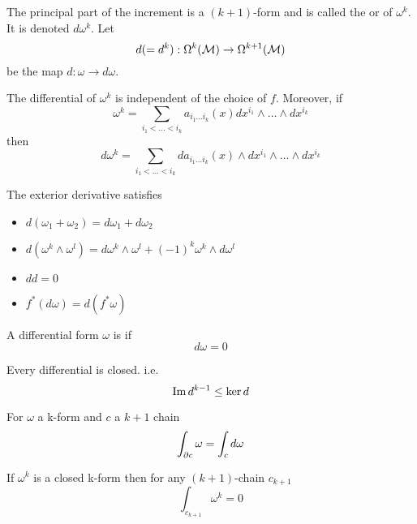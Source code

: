 \documentclass{article}
\begin{document}
\begin{definition}
The principal part of the increment is a $(k+1)$-form and is called the  or  of $\omega^k$. It is denoted $d\omega^k$. Let 
\[
d(=d^k): \Omega^k(\mathcal{M}) \to \Omega^{k+1}(\mathcal{M})
\]
be the map $d:\omega \to d\omega$. 
\end{definition}

\begin{theorem}
The differential of $\omega^k$ is independent of the choice of $f$. Moreover, if 
\[
\omega^k = \sum_{i_1<\dots<i_k} a_{i_1 \dots i_k}(x) dx^{i_1} \wedge \dots \wedge dx^{i_k}
\]
then 
\[
d\omega^k = \sum_{i_1<\dots<i_k} da_{i_1 \dots i_k}(x) \wedge dx^{i_1} \wedge \dots \wedge dx^{i_k}
\]
\end{theorem}

\begin{theorem}
The exterior derivative satisfies
\begin{itemize}
    \item $d(\omega_1 + \omega_2) = d\omega_1 + d\omega_2$
    \item $d(\omega^k \wedge \omega^l) = d\omega^k \wedge \omega^l + (-1)^k \omega^k \wedge d\omega^l $
    \item $dd=0$
    \item $f^\ast (d\omega) = d(f^\ast \omega)$
\end{itemize}
\end{theorem}

\begin{definition}[Closed]
A differential form $\omega$ is  if 
\[
d\omega = 0
\]
\end{definition}

\begin{theorem}
Every differential is closed. i.e. 
\[
\operatorname{Im} d^{k-1} \leq \ker d 
\]
\end{theorem}

\begin{theorem}
For $\omega$ a k-form and $c$ a $k+1$ chain 
\[
\int_{\partial c} \omega = \int_c d\omega
\]
\end{theorem}

\begin{corollary}
If $\omega^k$ is a closed k-form then for any $(k+1)$-chain $c_{k+1}$
\[
\int_{c_{k+1}} \omega^k = 0
\]
\end{corollary}

\end{document}
